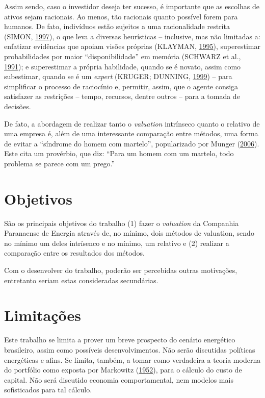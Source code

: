 \documentclass[grad,numbers]{coppe}
\begin{document}
  Assim sendo, caso o investidor deseja ter sucesso, é importante que as escolhas de ativos sejam racionais. Ao menos, tão racionais quanto possível forem para humanos. De fato, indivíduos estão sujeitos a uma racionalidade restrita (SIMON, \protect\hyperlink{ref-simon1997}{1997}), o que leva a diversas heurísticas -- inclusive, mas não limitadas a: enfatizar evidências que apoiam visões próprias (KLAYMAN, \protect\hyperlink{ref-klayman1995}{1995}), superestimar probabilidades por maior ``disponibilidade'' em memória (SCHWARZ et al., \protect\hyperlink{ref-schwarz1991}{1991}); e superestimar a própria habilidade, quando se é novato, assim como subestimar, quando se é um \emph{expert} (KRUGER; DUNNING, \protect\hyperlink{ref-kruger1999}{1999}) -- para simplificar o processo de raciocínio e, permitir, assim, que o agente consiga satisfazer as restrições -- tempo, recursos, dentre outros -- para a tomada de decisões.
  
  De fato, a abordagem de realizar tanto o \emph{valuation} intrínseco quanto o relativo de uma empresa é, além de uma interessante comparação entre métodos, uma forma de evitar a ``síndrome do homem com martelo'', popularizado por Munger (\protect\hyperlink{ref-munger2006}{2006}). Este cita um provérbio, que diz: ``Para um homem com um martelo, todo problema se parece com um prego.''
  
  \hypertarget{objetivos}{%
  \section{Objetivos}\label{objetivos}}
  
  São os principais objetivos do trabalho (1) fazer o \emph{valuation} da Companhia Paranaense de Energia através de, no mínimo, dois métodos de valuation, sendo no mínimo um deles intrísenco e no mínimo, um relativo e (2) realizar a comparação entre os resultados dos métodos.
  
  Com o desenvolver do trabalho, poderão ser percebidas outras motivações, entretanto seriam estas consideradas secundárias.
  
  \hypertarget{limitauxe7uxf5es}{%
  \section{Limitações}\label{limitauxe7uxf5es}}
  
  Este trabalho se limita a prover um breve prospecto do cenário energético brasileiro, assim como possíveis desenvolvimentos. Não serão discutidas políticas energéticas e afins. Se limita, também, a tomar como verdadeira a teoria moderna do portfólio como exposta por Markowitz (\protect\hyperlink{ref-markowitz1952}{1952}), para o cálculo do custo de capital. Não será discutido economia comportamental, nem modelos mais sofisticados para tal cálculo.
  
\end{document}
